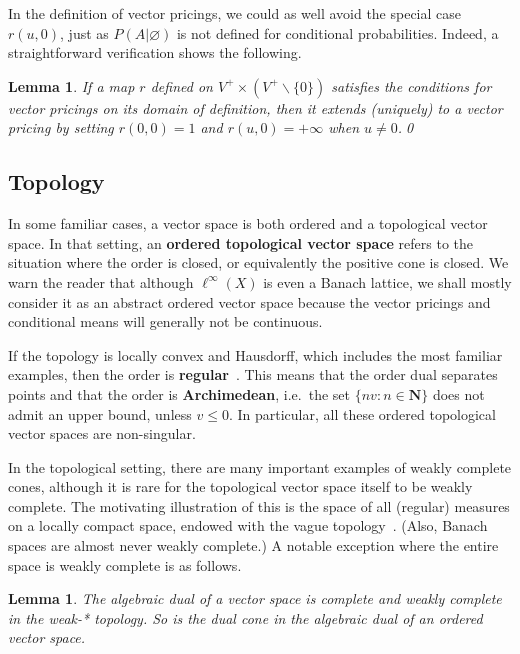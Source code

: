 \documentclass[11pt]{amsart}
\numberwithin{equation}{section}
\newtheorem{lem}[thm]{Lemma}
\theoremstyle{definition}
\theoremstyle{definition}
\newcommand*{\NN}{\mathbf{N}}
\begin{document}
In the definition of vector pricings, we could as well avoid the special case $r(u,0)$, just as $P(A|\varnothing)$ is not defined for conditional probabilities. Indeed, a straightforward verification shows the following.

\begin{lem}\label{lem:no-0}
If a map $r$ defined on $V^+ \times ( V^+ \smallsetminus \{0\})$ satisfies the conditions for vector pricings on its domain of definition, then it extends (uniquely) to a vector pricing by setting $r(0,0)=1$ and $r(u, 0)=+\infty$ when $u\neq 0$.\qed
\end{lem}

\subsection{Topology}\label{sec:topol}%
In some familiar cases, a vector space is both ordered and a topological vector space. In that setting, an \textbf{ordered topological vector space} refers to the situation where the order is closed, or equivalently the positive cone is closed. We warn the reader that although $\ell^\infty(X)$ is even a Banach lattice, we shall mostly consider it as an abstract ordered vector space because the vector pricings and conditional means will generally not be continuous.

If the topology is locally convex and Hausdorff, which includes the most familiar examples, then the order is \textbf{regular}~\cite[V.4.1]{Schaefer}. This means that the order dual separates points and that the order is \textbf{Archimedean}, i.e.\ the set $\{n v:n\in \NN\}$ does not admit an upper bound, unless $v\leq 0$. In particular, all these ordered topological vector spaces are non-singular.


\medskip
In the topological setting, there are many important examples of  weakly complete cones, although it is rare for the topological vector space itself to be weakly complete. The motivating illustration of this is the space of all (regular) measures on a locally compact space, endowed with the vague topology~\cite[III \S\,1 No.\,9]{BourbakiINT14}. (Also, Banach spaces are almost never weakly complete.) A notable exception where the entire space is weakly complete is as follows.

\begin{lem}\label{lem:dual-complete}
The algebraic dual of a vector space is complete and weakly complete in the weak-* topology. So is the dual cone in the algebraic dual of an ordered vector space.
\end{lem}
\end{document}
